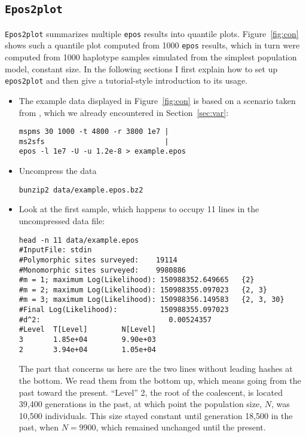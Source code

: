 \documentclass[a4paper, english]{article}
\newcommand{\ty}{\texttt}
\begin{document}
\subsection{\ty{Epos2plot}}
\ty{Epos2plot} summarizes multiple
\ty{epos} results into
quantile plots. Figure~\ref{fig:con} shows such a quantile plot 
computed from 1000 \ty{epos} \citep{lyn19:inf} results, which in turn
were computed from 1000 haplotype samples simulated
from the simplest population model, constant size. In the following
sections I first explain how to set up \ty{epos2plot} and then give a
tutorial-style introduction to its usage.

\begin{itemize}
\item The example data displayed in Figure~\ref{fig:con} is based on a
scenario taken from \citep[Figure 2a]{liu15:exp}, which we already
encountered in Section~\ref{sec:var}:
\begin{verbatim}
mspms 30 1000 -t 4800 -r 3800 1e7 |
ms2sfs                            |
epos -l 1e7 -U -u 1.2e-8 > example.epos
\end{verbatim}
\item Uncompress the data
\begin{verbatim}
bunzip2 data/example.epos.bz2
\end{verbatim}
\item Look at the first sample, which happens to occupy 11 lines in
  the uncompressed data file:
\begin{verbatim}
head -n 11 data/example.epos 
#InputFile:	stdin
#Polymorphic sites surveyed:	19114
#Monomorphic sites surveyed:	9980886
#m = 1; maximum Log(Likelihood): 150988352.649665	{2}
#m = 2; maximum Log(Likelihood): 150988355.097023	{2, 3}
#m = 3; maximum Log(Likelihood): 150988356.149583	{2, 3, 30}
#Final Log(Likelihood):          150988355.097023
#d^2:                              0.00524357
#Level  T[Level]        N[Level]
3       1.85e+04        9.90e+03
2       3.94e+04        1.05e+04
\end{verbatim}
The part that concerns us here are the two lines without
leading hashes at the bottom. We read them from the bottom up, which means going
from the past toward the present. ``Level'' 2, the root of the
coalescent, is located 39,400 generations in the past, at
which point the population size, $N$, was 10,500 individuals. This
size stayed constant until generation 18,500 in the past,
when $N=9900$, which remained unchanged until the present.


\end{itemize}
\end{document}
